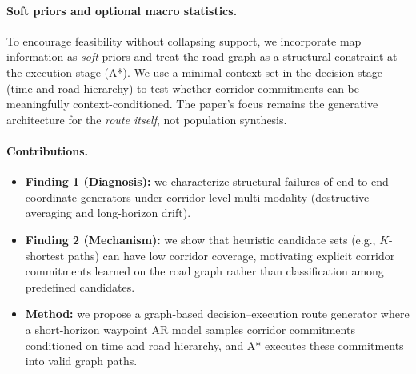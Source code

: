 \paragraph{Soft priors and optional macro statistics.}
To encourage feasibility without collapsing support, we incorporate map information as \emph{soft} priors and treat the road graph as a structural constraint at the execution stage (A*).
We use a minimal context set in the decision stage (time and road hierarchy) to test whether corridor commitments can be meaningfully context-conditioned.
The paper's focus remains the generative architecture for the \emph{route itself}, not population synthesis.

\paragraph{Contributions.}
\begin{itemize}
  \item \textbf{Finding 1 (Diagnosis):} we characterize structural failures of end-to-end coordinate generators under corridor-level multi-modality (destructive averaging and long-horizon drift).
  \item \textbf{Finding 2 (Mechanism):} we show that heuristic candidate sets (e.g., $K$-shortest paths) can have low corridor coverage, motivating explicit corridor commitments learned on the road graph rather than classification among predefined candidates.
  \item \textbf{Method:} we propose a graph-based decision--execution route generator where a short-horizon waypoint AR model samples corridor commitments conditioned on time and road hierarchy, and A* executes these commitments into valid graph paths.
\end{itemize}
